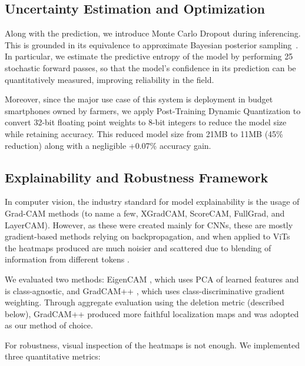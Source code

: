 \documentclass[runningheads]{llncs}
\begin{document}
\subsection{Uncertainty Estimation and Optimization}

Along with the prediction, we introduce Monte Carlo Dropout during inferencing. This is grounded in its equivalence to approximate Bayesian posterior sampling~\cite{gal2016dropout}. In particular, we estimate the predictive entropy of the model by performing 25 stochastic forward passes, so that the model's confidence in its prediction can be quantitatively measured, improving reliability in the field.

Moreover, since the major use case of this system is deployment in budget smartphones owned by farmers, we apply Post-Training Dynamic Quantization to convert 32-bit floating point weights to 8-bit integers to reduce the model size while retaining accuracy. This reduced model size from 21MB to 11MB (45\% reduction) along with a negligible +0.07\% accuracy gain.

\subsection{Explainability and Robustness Framework}

In computer vision, the industry standard for model explainability is the usage of Grad-CAM methods (to name a few, XGradCAM, ScoreCAM, FullGrad, and LayerCAM). However, as these were created mainly for CNNs, these are mostly gradient-based methods relying on backpropagation, and when applied to ViTs the heatmaps produced are much noisier and scattered due to blending of information from different tokens \cite{abnar2020quantifying}.

We evaluated two methods: EigenCAM \cite{bany2020}, which uses PCA of learned features and is class-agnostic, and GradCAM++ \cite{chattopadhay2018}, which uses class-discriminative gradient weighting. Through aggregate evaluation using the deletion metric (described below), GradCAM++ produced more faithful localization maps and was adopted as our method of choice.

For robustness, visual inspection of the heatmaps is not enough. We implemented three quantitative metrics:
\end{document}
